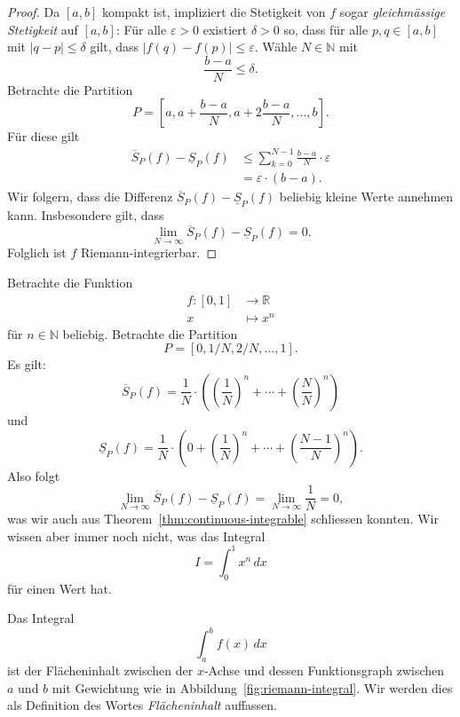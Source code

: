\documentclass[../main.tex]{subfiles}
\begin{document}
\begin{proof}
  Da $[a, b]$ kompakt ist, impliziert die Stetigkeit von $f$ sogar
  \emph{gleichmässige Stetigkeit} auf $[a, b]$:
  Für alle $\varepsilon > 0$ existiert $\delta > 0$ so, dass
  für alle $p, q \in [a, b]$ mit $|q - p| \leq \delta$ gilt, dass
  $|f(q) - f(p)| \leq \varepsilon$.
  Wähle $N \in \mathbb{N}$ mit
  \[
    \frac{b-a}{N} \leq \delta.
  \]
  Betrachte die Partition
   \[
    P = \left[ a, a + \frac{b - a}{N}, a + 2 \frac{b-a}{N}, \dots,
    b\right].
  \]
  Für diese gilt
  \begin{align*}
    \overline S_P(f) - \underline S_P(f)
    &\leq \sum_{k=0}^{N-1} \frac{b-a}{N}\cdot \varepsilon  \\
    &= \varepsilon \cdot (b-a).
  \end{align*}
  Wir folgern, dass die Differenz $\overline S_P(f) - \underline S_P(f)$
  beliebig kleine Werte annehmen kann. Insbesondere gilt,
  dass
  \[
    \lim_{N \to \infty} \overline S_P(f) - \underline S_P(f) = 0.
  \]
  Folglich ist $f$ Riemann-integrierbar.
\end{proof}

\begin{example}
  Betrachte die Funktion
  \begin{align*}
    f \colon [0, 1] & \to \mathbb{R} \\
    x & \mapsto x^n
  \end{align*}
  für $n \in \mathbb{N}$ beliebig. Betrachte die
  Partition
  \[
    P = [0, 1/N, 2/N, \dots, 1].
  \]
  Es gilt:
  \[
    \overline S_P(f) = \frac{1}{N} \cdot \left( {\left( \frac{1}{N}  \right)}^n
    + \cdots + {\left( \frac{N}{N}  \right)}^n \right)
  \]
  und
  \[
    \underline S_P(f) = \frac{1}{N} \cdot \left( 0 +{\left( \frac{1}{N}  \right)}^n
    + \cdots + {\left( \frac{N-1}{N}  \right)}^n\right).
  \]
  Also folgt
  \[
    \lim_{N \to \infty} \overline S_P(f) - \underline S_P(f) =
    \lim_{N \to \infty}\frac{1}{N} = 0,
  \]
  was wir auch aus Theorem~\ref{thm:continuous-integrable} schliessen konnten.
  Wir wissen aber immer noch nicht, was das Integral
  \[
    I = \int_{0}^{1} x^n \, dx
  \]
  für einen Wert hat.
\end{example}

\begin{geometric}
  Das Integral
  \[
    \int_{a}^{b} f(x) \, dx
  \]
  ist der Flächeninhalt zwischen der $x$-Achse und dessen
  Funktionsgraph zwischen $a$ und $b$ mit Gewichtung
  wie in Abbildung~\ref{fig:riemann-integral}.
  Wir werden dies als Definition des Wortes
  \textit{Flächeninhalt} auffassen.
\end{geometric}
\end{document}
